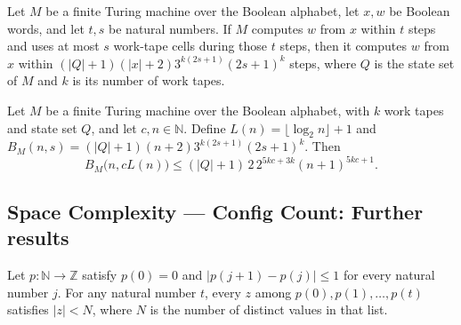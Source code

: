 \begin{theorem}
\label{Turing.FinTM.ComputesInTime.of_spaceUsed_le}
\leanok
{}
Let $M$ be a finite Turing machine over the Boolean alphabet, let $x,w$ be Boolean
words, and let $t,s$ be natural numbers. If $M$ computes $w$ from $x$ within $t$ steps
and uses at most $s$ work-tape cells during those $t$ steps, then it computes $w$ from
$x$ within $(|Q|+1)(|x|+2)3^{k(2s+1)}(2s+1)^k$ steps, where $Q$ is the state set of $M$
and $k$ is its number of work tapes.
\end{theorem}

\begin{theorem}
\label{Turing.FinTM.configBound_logSpace_le}
\leanok
{}
Let $M$ be a finite Turing machine over the Boolean alphabet, with $k$ work tapes and
state set $Q$, and let $c,n\in\mathbb{N}$. Define $L(n)=\lfloor\log_2 n\rfloor+1$ and
$B_M(n,s)=(|Q|+1)(n+2)3^{k(2s+1)}(2s+1)^k$. Then
\[
B_M\bigl(n,cL(n)\bigr)\le (|Q|+1)\,2\,2^{5kc+3k}(n+1)^{5kc+1}.
\]
\end{theorem}

\subsection*{Space Complexity --- Config Count: Further results}

\begin{lemma}
\label{Turing.MultiTapeTM.ConfigCount.abs_lt_card_image_of_unitSteps}
\leanok
{}
Let $p:\mathbb{N}\to\mathbb{Z}$ satisfy $p(0)=0$ and $|p(j+1)-p(j)|\le 1$ for every
natural number $j$. For any natural number $t$, every $z$ among $p(0),p(1),\ldots,p(t)$
satisfies $|z|<N$, where $N$ is the number of distinct values in that list.
\end{lemma}

